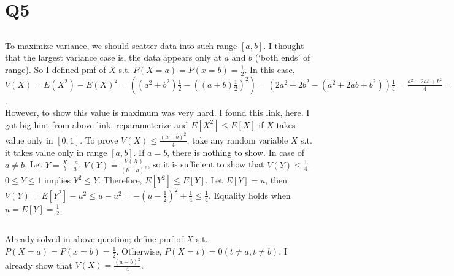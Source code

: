 \documentclass{article}
\begin{document}
\section{Q5}

\subsection{}
To maximize variance, we should scatter data into such range $[a,b]$.
I thought that the largest variance case is, the data appears only at $a$ and $b$ (`both ends' of range).
So I defined pmf of $X$ s.t. $P(X=a)=P(x=b)=\frac{1}{2}$.
In this case,
$V(X) = E(X^2) - E(X)^2
= ((a^2 + b^2)\frac{1}{2} - ((a+b)\frac{1}{2})^2)
= (2a^2+2b^2-(a^2+2ab+b^2))\frac{1}{4}
= \frac{a^2-2ab+b^2}{4}
= \frac{(a-b)^2}{4}$. \\

However, to show this value is maximum was very hard.
I found this link, \href{https://stats.stackexchange.com/questions/45588/variance-of-a-bounded-random-variable}{here}.
I got big hint from above link, reparameterize and $E[X^2] \leq E[X]$ if $X$ takes value only in $[0,1]$.
To prove $V(X) \leq \frac{(a-b)^2}{4}$, take any random variable $X$ s.t. it takes value only in range $[a,b]$.
If $a=b$, there is nothing to show.
In case of $a \neq b$, Let $Y=\frac{X-a}{b-a}$.
$V(Y)=\frac{V(X)}{(b-a)^2}$, so it is sufficient to show that $V(Y) \leq \frac{1}{4}$.
$0 \leq Y \leq 1$ implies $Y^2 \leq Y$.
Therefore, $E[Y^2] \leq E[Y]$.
Let $E[Y]=u$, then
$V(Y) = E[Y^2] - u^2
\leq u - u^2
= -(u-\frac{1}{2})^2 + \frac{1}{4}
\leq \frac{1}{4}$.
Equality holds when $u=E[Y]=\frac{1}{2}$.

\subsection{}
Already solved in above question; define pmf of $X$ s.t. $P(X=a)=P(x=b)=\frac{1}{2}$.
Otherwise, $P(X=t)=0 (t \neq a, t \neq b)$.
I already show that $V(X) = \frac{(a-b)^2}{4}$.
\end{document}
